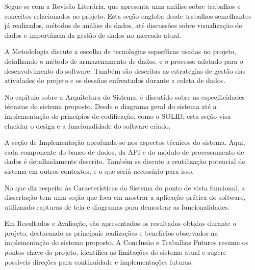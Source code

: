 Segue-se com a Revisão Literária, que apresenta uma análise sobre trabalhos e conceitos relacionados ao projeto. Esta seção engloba desde trabalhos semelhantes já realizados, métodos de análise de dados, até discussões sobre visualização de dados e importância da gestão de dados no mercado atual.

A Metodologia discute a escolha de tecnologias específicas usadas no projeto, detalhando o método de armazenamento de dados, e o processo adotado para o desenvolvimento do software. Também são descritas as estratégias de gestão das atividades do projeto e os desafios enfrentados durante a coleta de dados.

No capítulo sobre a Arquitetura do Sistema, é discutido sobre as especificidades técnicas do sistema proposto. Desde o diagrama geral do sistema até a implementação de princípios de codificação, como o SOLID, esta seção visa elucidar o design e a funcionalidade do software criado.

A seção de Implementação aprofunda-se nos aspectos técnicos do sistema. Aqui, cada componente do banco de dados, da API e do módulo de processamento de dados é detalhadamente descrito. Também se discute a reutilização potencial do sistema em outros contextos, e o que seriá necessário para isso.

No que diz respeito às Características do Sistema do ponto de vista funcional, a dissertação tem uma seção que foca em mostrar a aplicação prática do software, utilizando capturas de tela e diagramas para demostrar as funcionalidades.

Em Resultados e Avaliação, são apresentados os resultados obtidos durante o projeto, destacando as principais realizações e benefícios observados na implementação do sistema proposto. A Conclusão e Trabalhos Futuros resume os pontos chave do projeto, identifica as limitações do sistema atual e sugere possíveis direções para continuidade e implementações futuras.




